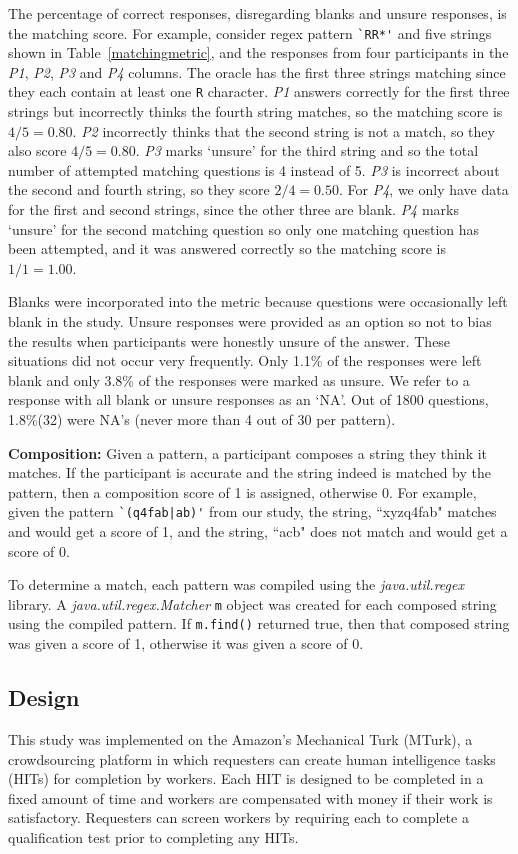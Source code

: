 The percentage of correct responses, disregarding blanks and unsure responses, is the matching score.
For example, consider regex pattern \verb!`RR*'! and five strings shown in Table~\ref{matchingmetric}, and the responses from four participants in the \emph{P1}, \emph{P2}, \emph{P3} and \emph{P4} columns.
The oracle has the first three strings matching since they each contain at least one \verb!R! character. \emph{P1} answers correctly for the first three strings but incorrectly thinks the fourth string matches, so the matching score is $4/5 = 0.80$. \emph{P2} incorrectly thinks that the second string is not a match, so they also score $4/5 = 0.80$.  \emph{P3} marks `unsure' for the third string and so the total number of attempted matching questions is 4 instead of 5. \emph{P3} is incorrect about the second and fourth string, so they score $2/4 = 0.50$.  For \emph{P4}, we only have data for the first and second strings, since the other three are blank.  \emph{P4} marks `unsure' for the second matching question so only one matching question has been attempted, and it was answered correctly so the matching score is $1/1 = 1.00$.

Blanks were incorporated into the metric because questions were occasionally left blank in the study. Unsure responses were provided as an option so not to bias the  results when participants were honestly unsure of the answer. These situations did not occur very frequently. Only 1.1\% of the responses were left blank and only 3.8\% of the responses were marked as unsure.  We refer to a response with all blank or unsure responses as an `NA'. Out of 1800 questions, 1.8\%(32) were NA's (never more than 4 out of 30 per pattern).

\textbf{Composition:}
Given a pattern, a participant composes a string they think it matches. If the participant is accurate and the string indeed is matched by the pattern, then a composition score of 1 is assigned, otherwise 0.  For example, given the pattern \verb!`(q4fab|ab)'! from our study, the string, ``xyzq4fab" matches  and would get a score of 1, and the string, ``acb" does not match and would get a score of 0.

To determine a match, each pattern was compiled using the \emph{java.util.regex} library. A \emph{java.util.regex.Matcher} \verb!m! object was created for each composed string using the compiled pattern.  If \verb!m.find()! returned true, then that composed string was given a score of 1, otherwise it was given a score of 0.

\subsection{Design}
This study was implemented on the Amazon's Mechanical Turk (MTurk),  a crowdsourcing platform in which requesters can create human intelligence tasks (HITs) for completion by workers. Each HIT is designed to be completed in a fixed amount of time and workers are compensated with money if their work is satisfactory. Requesters can screen workers by requiring each to complete a qualification test prior to completing any HITs.

